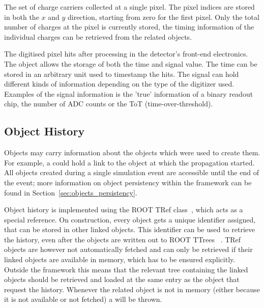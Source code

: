 The set of charge carriers collected at a single pixel.
The pixel indices are stored in both the $x$ and $y$ direction, starting from zero for the first pixel.
Only the total number of charges at the pixel is currently stored, the timing information of the individual charges can be retrieved from the related  objects.

The digitised pixel hits after processing in the detector's front-end electronics.
The object allows the storage of both the time and signal value.
The time can be stored in an arbitrary unit used to timestamp the hits.
The signal can hold different kinds of information depending on the type of the digitizer used.
Examples of the signal information is the 'true' information of a binary readout chip, the number of ADC counts or the ToT (time-over-threshold).

\subsection{Object History}
\label{sec:objhistory}

Objects may carry information about the objects which were used to create them.
For example, a  could hold a link to the  object at which the propagation started.
All objects created during a single simulation event are accessible until the end of the event; more information on object persistency within the framework can be found in Section~\ref{sec:objects_persistency}. 

Object history is implemented using the ROOT TRef class~\cite{roottref}, which acts as a special reference.
On construction, every object gets a unique identifier assigned, that can be stored in other linked objects.
This identifier can be used to retrieve the history, even after the objects are written out to ROOT TTrees ~\cite{roottree}.
TRef objects are however not automatically fetched and can only be retrieved if their linked objects are available in memory, which has to be ensured explicitly.
Outside the framework this means that the relevant tree containing the linked objects should be retrieved and loaded at the same entry as the object that request the history.
Whenever the related object is not in memory (either because it is not available or not fetched) a  will be thrown.